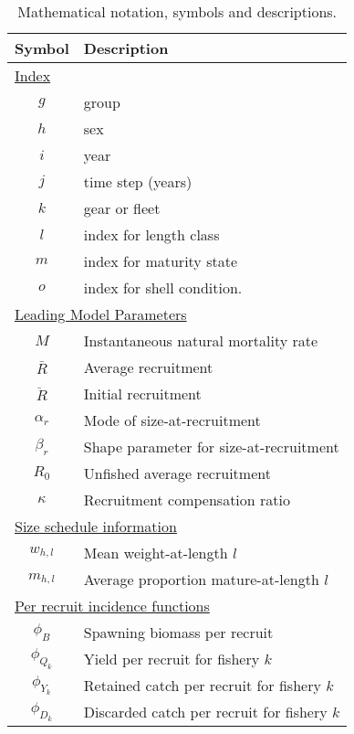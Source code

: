 \documentclass[12pt,letterpaper]{article}
\begin{document}
\begin{table}
  \centering
  \caption{Mathematical notation, symbols and descriptions.}
  \label{tab:notation}
  \begin{tabular}{cl}
  \hline
  Symbol  & Description \\
  \hline
  \multicolumn{2}{l}{\underline{Index}}\\
      $g$ & group \\
      $h$ & sex \\
      $i$ & year \\
      $j$ & time step (years) \\
      $k$ & gear or fleet \\
      $l$ & index for length class \\
      $m$ & index for maturity state \\
      $o$ & index for shell condition. \\
  \multicolumn{2}{l}{\underline{Leading Model Parameters}}\\
      $M$         & Instantaneous natural mortality rate\\
      $\bar{R}$   & Average recruitment\\
      $\ddot{R}$  & Initial recruitment\\
      $\alpha_r$  & Mode of size-at-recruitment\\
      $\beta_r $  & Shape parameter for size-at-recruitment\\
      $R_0$       & Unfished average recruitment\\
      $\kappa$    & Recruitment compensation ratio\\
  \multicolumn{2}{l}{\underline{Size schedule information}}\\
      $w_{h,l}$   & Mean weight-at-length $l$ \\
      $m_{h,l}$   & Average proportion mature-at-length $l$ \\
  \multicolumn{2}{l}{\underline{Per recruit incidence functions}} \\
      $\phi_B$    & Spawning biomass per recruit \\
      $\phi_{Q_k}$& Yield per recruit for fishery $k$\\
      $\phi_{Y_k}$& Retained catch per recruit for fishery $k$ \\
      $\phi_{D_k}$& Discarded catch per recruit for fishery $k$ \\
  \hline
  \end{tabular}
\end{table}
\end{document}
